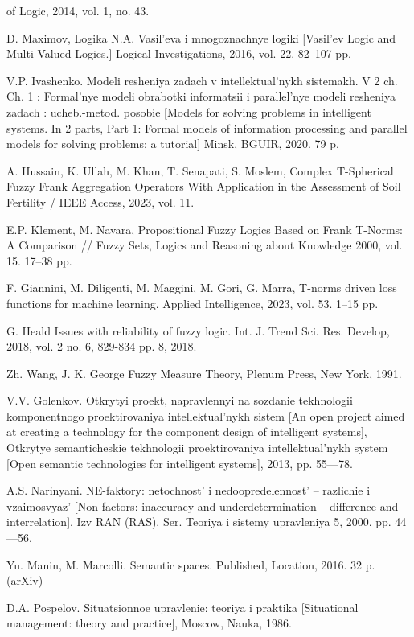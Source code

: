 \documentclass{article}
\begin{document}
\begin{multicols}{2}
\begin{enumerate}[label={[\arabic*]},itemsep=0pt, leftmargin=2em, labelsep=1em,topsep=0pt]
of Logic, 2014, vol. 1, no. 43.
\noindent\item D. Maximov, Logika N.A. Vasil’eva i mnogoznachnye logiki
[Vasil’ev Logic and Multi-Valued Logics.] Logical Investigations,
2016, vol. 22. 82–107 pp.
\noindent \item V.P. Ivashenko. Modeli resheniya zadach v intellektual’nykh sistemakh. V 2 ch. Ch. 1 : Formal’nye modeli obrabotki informatsii
i parallel’nye modeli resheniya zadach : ucheb.-metod. posobie
[Models for solving problems in intelligent systems. In 2 parts,
Part 1: Formal models of information processing and parallel
models for solving problems: a tutorial] Minsk, BGUIR, 2020.
79 p.

\noindent \item A. Hussain, K. Ullah, M. Khan, T. Senapati, S. Moslem,
Complex T-Spherical Fuzzy Frank Aggregation Operators With
Application in the Assessment of Soil Fertility / IEEE Access,
2023, vol. 11.
\noindent \item E.P. Klement, M. Navara, Propositional Fuzzy Logics Based
on Frank T-Norms: A Comparison // Fuzzy Sets, Logics and
Reasoning about Knowledge 2000, vol. 15. 17–38 pp.
\noindent \item F. Giannini, M. Diligenti, M. Maggini, M. Gori, G. Marra,
T-norms driven loss functions for machine learning. Applied
Intelligence, 2023, vol. 53. 1–15 pp.
\noindent \item G. Heald Issues with reliability of fuzzy logic. Int. J. Trend Sci.
Res. Develop, 2018, vol. 2 no. 6, 829-834 pp. 8, 2018.
\noindent \item Zh. Wang, J. K. George Fuzzy Measure Theory, Plenum Press,
New York, 1991.
\noindent \item V.V. Golenkov. Otkrytyi proekt, napravlennyi na sozdanie
tekhnologii komponentnogo proektirovaniya intellektual’nykh sistem [An open project aimed at creating a technology for the
component design of intelligent systems], Otkrytye semanticheskie tekhnologii proektirovaniya intellektual’nykh system [Open
semantic technologies for intelligent systems], 2013, pp. 55—78.
\noindent \item A.S. Narinyani. NE-faktory: netochnost’ i nedoopredelennost’ –
razlichie i vzaimosvyaz’ [Non-factors: inaccuracy and underdetermination – difference and interrelation]. Izv RAN (RAS). Ser.
Teoriya i sistemy upravleniya 5, 2000. pp. 44—56.
\noindent \item Yu. Manin, M. Marcolli. Semantic spaces. Published, Location,
2016. 32 p. (arXiv)
\noindent \item D.A. Pospelov. Situatsionnoe upravlenie: teoriya i praktika [Situational management: theory and practice], Moscow, Nauka, 1986.

\end{enumerate}
\end{multicols}
\end{document}

